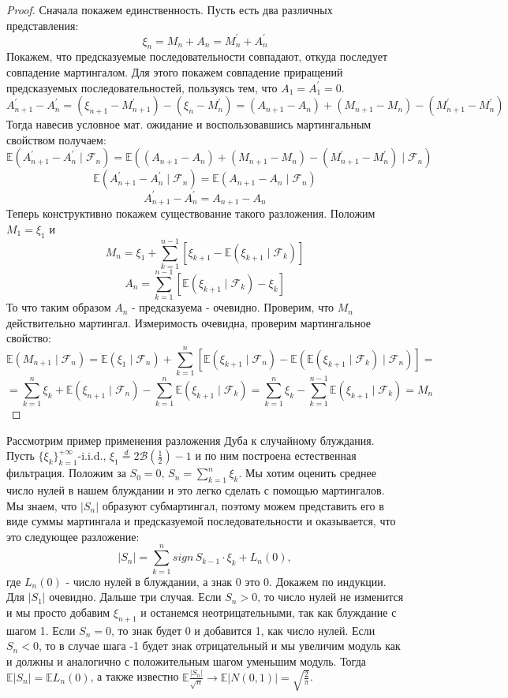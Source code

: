 \documentclass[12pt,a4paper]{article} %
\newcommand{\E}{\mathbb{E}}
\newcommand{\F}{\mathcal{F}}
\begin{document}
	\begin{proof}
		Сначала покажем единственность. Пусть есть два различных представления:
		$$\xi_n=M_n+A_n=M_n^{'}+A_n^{'}$$
		Покажем, что предсказуемые последовательности совпадают, откуда последует совпадение мартингалом. Для этого покажем совпадение приращений предсказуемых последовательностей, пользуясь тем, что $A_1=A_1^{'}=0$.
		$$A_{n+1}^{'}-A_n^{'}=(\xi_{n+1}-M_{n+1}^{'})-(\xi_n-M_n^{'})=(A_{n+1}-A_n)+(M_{n+1}-M_n)-(M_{n+1}^{'}-M_n^{'})$$
		Тогда навесив условное мат. ожидание и воспользовавшись мартингальным свойством получаем:
		$$\E(A_{n+1}^{'}-A_n^{'}\mid\F_n)=\E((A_{n+1}-A_n)+(M_{n+1}-M_n)-(M_{n+1}^{'}-M_n^{'})\mid\F_n)$$
		$$\E(A_{n+1}^{'}-A_n^{'}\mid\F_n)=\E(A_{n+1}-A_n\mid\F_n)$$
		$$A_{n+1}^{'}-A_n^{'}=A_{n+1}-A_n$$
		Теперь конструктивно покажем существование такого разложения. Положим $M_1=\xi_1$ и
		$$M_n=\xi_1+\sum_{k=1}^{n-1}[\xi_{k+1}-\E(\xi_{k+1}\mid\F_k)]$$
		$$A_n=\sum_{k=1}^{n-1}[\E(\xi_{k+1}\mid\F_k)-\xi_k]$$
		То что таким образом $A_n$ - предсказуема - очевидно. Проверим, что $M_n$ действительно мартингал. Измеримость очевидна, проверим мартингальное свойство:
		$$\E(M_{n+1}\mid\F_n)=\E(\xi_1\mid\F_n)+\sum_{k=1}^n[\E(\xi_{k+1}\mid\F_n)-\E(\E(\xi_{k+1}\mid\F_k)\mid\F_n)]=$$
		$$=\sum_{k=1}^n\xi_k+\E(\xi_{n+1}\mid\F_n)-\sum_{k=1}^n\E(\xi_{k+1}\mid\F_k)=\sum_{k=1}^n\xi_k-\sum_{k=1}^{n-1}\E(\xi_{k+1}\mid\F_k)=M_n$$
	\end{proof}
	Рассмотрим пример применения разложения Дуба к случайному блуждания. Пусть $\{\xi_k\}_{k=1}^{+\infty}$-i.i.d., $\xi_1\overset{d}{=}2\mathcal{B}(\frac{1}{2})-1$ и по ним построена естественная фильтрация. Положим за $S_0=0,\,S_n=\displaystyle\sum_{k=1}^n\xi_k$. Мы хотим оценить среднее число нулей в нашем блуждании и это легко сделать с помощью мартингалов. Мы знаем, что $|S_n|$ образуют субмартингал, поэтому можем представить его в виде суммы мартингала и предсказуемой последовательности и оказывается, что это следующее разложение:
	$$|S_n|=\sum_{k=1}^nsign\,S_{k-1}\cdot\xi_k+L_n(0),$$
	где $L_n(0)$ - число нулей в блуждании, а знак 0 это 0. Докажем по индукции. Для $|S_1|$ очевидно. Дальше три случая. Если $S_n>0$, то число нулей не изменится и мы просто добавим $\xi_{n+1}$ и останемся неотрицательными, так как блуждание с шагом 1. Если $S_n=0$, то знак будет 0 и добавится 1, как число нулей. Если $S_n<0$, то в случае шага -1 будет знак отрицательный и мы увеличим модуль как и должны и аналогично с положительным шагом уменьшим модуль. Тогда $\E|S_n|=\E L_n(0)$, а также известно $\E\frac{|S_n|}{\sqrt{n}}\rightarrow\E|N(0,1)|=\sqrt{\frac{2}{\pi}}$.
\end{document}
